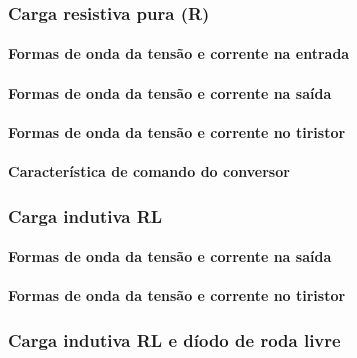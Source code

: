 \documentclass[a4paper,11pt]{article}
\numberwithin{equation}{section}
\begin{document}
\subsubsection{Carga resistiva pura (R)}

\paragraph{Formas de onda da tensão e corrente na entrada}


\paragraph{Formas de onda da tensão e corrente na saída}



\paragraph{Formas de onda da tensão e corrente no tiristor}


\paragraph{Característica de comando do conversor}


\subsubsection{Carga indutiva RL}

\paragraph{Formas de onda da tensão e corrente na saída}


\paragraph{Formas de onda da tensão e corrente no tiristor}



\subsubsection{Carga indutiva RL e díodo de roda livre}
\end{document}
